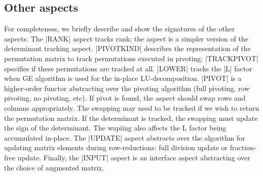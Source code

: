 \documentclass{elsart}
\begin{document}
\subsection{Other aspects}

For completeness, we briefly describe and show the signatures of the
other aspects. The |RANK| aspect tracks rank; the aspect is a simpler
version of the determinant tracking aspect.  |PIVOTKIND| describes the
representation of the permutation matrix to track permutations
executed in pivoting; |TRACKPIVOT| specifies if these permutations are
tracked at all. |LOWER| tracks the |L| factor when GE algorithm is
used for the in-place LU-decomposition. |PIVOT| is a higher-order
functor abstracting over the pivoting algorithm (full pivoting, row
pivoting, no pivoting, etc). If pivot is found, the aspect should swap
rows and columns appropriately. The swapping may need to be tracked if
we wish to return the permutation matrix. If the determinant is
tracked, the swapping must update the sign of the determinant. The
wapiing also affects the L factor being accumulated in-place. The
|UPDATE| aspect abstracts over the algorithm for updating matrix
elements during row-reductions: full division update or fraction-free
update. Finally, the |INPUT| aspect is an interface aspect abstracting
over the choice of augmented matrix.
\end{document}
